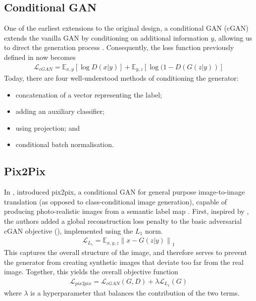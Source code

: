 \subsection{Conditional GAN}

One of the earliest extensions to the original design, a conditional GAN (cGAN) extends the vanilla GAN by conditioning on additional information $y$, allowing us to direct the generation process \cite{DBLP:journals/corr/MirzaO14}.
Consequently, the loss function previously defined in  now becomes
\begin{align} \label{eq:cganloss}
    \mathcal{L}_{cGAN} = \mathbb{E}_{x, y}[\log D(x|y)] + \mathbb{E}_{y, z}[\log (1-D(G(z|y))]
\end{align}
Today, there are four well-understood methods of conditioning the generator:
\begin{itemize}
    \item concatenation of a vector representing the label;
    \item adding an auxiliary classifier;
    \item using projection; and
    \item conditional batch normalisation.
\end{itemize}

\subsection{Pix2Pix} \label{sec:pix2pix}

In \citeyear{pix2pix}, \citeauthor{pix2pix} introduced pix2pix, a conditional GAN for general purpose image-to-image translation (as opposed to class-conditional image generation), capable of producing photo-realistic images from a semantic label map \cite{pix2pix}.
First, inspired by \cite{DBLP:journals/corr/PathakKDDE16}, the authors added a global reconstruction loss penalty to the basic adversarial cGAN objective (), implemented using the $L_1$ norm.
\begin{align}
    \mathcal{L}_{L_1} = \mathbb{E}_{x, y, z} \left\lVert x - G(z|y) \right\rVert_1
\end{align}
This captures the overall structure of the image, and therefore serves to prevent the generator from creating synthetic images that deviate too far from the real image. 
Together, this yields the overall objective function
\begin{align} \label{eq:pix2pixloss}
    \mathcal{L}_{pix2pix} = \mathcal{L}_{cGAN}(G, D) + \lambda \mathcal{L}_{L_1}(G)
\end{align}
where $\lambda$ is a hyperparameter that balances the contribution of the two terms.

